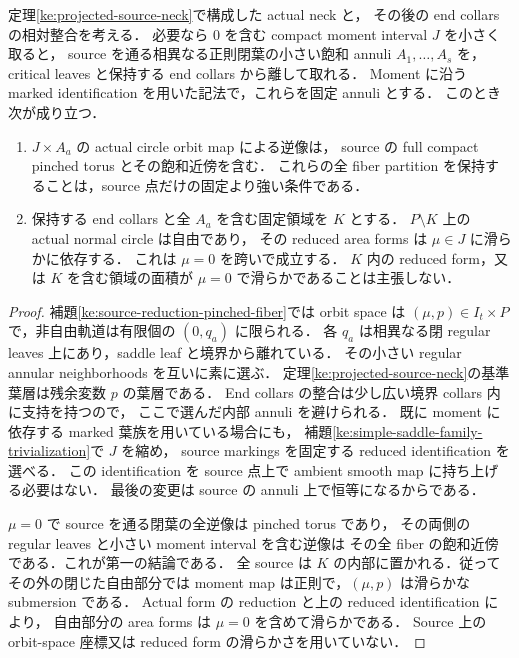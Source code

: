 \begin{lemma}
\label{ng8:p0-source-protected-reduction}
定理\ref{ke:projected-source-neck}で構成した actual neck と，
その後の end collars の相対整合を考える．
必要なら $0$ を含む compact moment interval $J$ を小さく取ると，
source を通る相異なる正則閉葉の小さい飽和 annuli
$A_1,\ldots,A_s$ を，critical leaves と保持する end collars から離して取れる．
Moment に沿う marked identification を用いた記法で，これらを固定 annuli とする．
このとき次が成り立つ．
\begin{enumerate}
\item $J\times A_a$ の actual circle orbit map による逆像は，
source の full compact pinched torus とその飽和近傍を含む．
これらの全 fiber partition を保持することは，source 点だけの固定より強い条件である．
\item 保持する end collars と全 $A_a$ を含む固定領域を $K$ とする．
$P\setminus K$ 上の actual normal circle は自由であり，
その reduced area forms は $\mu\in J$ に滑らかに依存する．
これは $\mu=0$ を跨いで成立する．
$K$ 内の reduced form，又は $K$ を含む領域の面積が
$\mu=0$ で滑らかであることは主張しない．
\end{enumerate}
\end{lemma}

\begin{proof}
補題\ref{ke:source-reduction-pinched-fiber}では orbit space は
$(\mu,p)\in I_t\times P$ で，非自由軌道は有限個の $(0,q_a)$ に限られる．
各 $q_a$ は相異なる閉 regular leaves 上にあり，saddle leaf と境界から離れている．
その小さい regular annular neighborhoods を互いに素に選ぶ．
定理\ref{ke:projected-source-neck}の基準葉層は残余変数 $p$ の葉層である．
End collars の整合は少し広い境界 collars 内に支持を持つので，
ここで選んだ内部 annuli を避けられる．
既に moment に依存する marked 葉族を用いている場合にも，
補題\ref{ke:simple-saddle-family-trivialization}で $J$ を縮め，
source markings を固定する reduced identification を選べる．
この identification を source 点上で ambient smooth map に持ち上げる必要はない．
最後の変更は source の annuli 上で恒等になるからである．

$\mu=0$ で source を通る閉葉の全逆像は pinched torus であり，
その両側の regular leaves と小さい moment interval を含む逆像は
その全 fiber の飽和近傍である．これが第一の結論である．
全 source は $K$ の内部に置かれる．従ってその外の閉じた自由部分では
moment map は正則で，$(\mu,p)$ は滑らかな submersion である．
Actual form の reduction と上の reduced identification により，
自由部分の area forms は $\mu=0$ を含めて滑らかである．
Source 上の orbit-space 座標又は reduced form の滑らかさを用いていない．
\end{proof}

